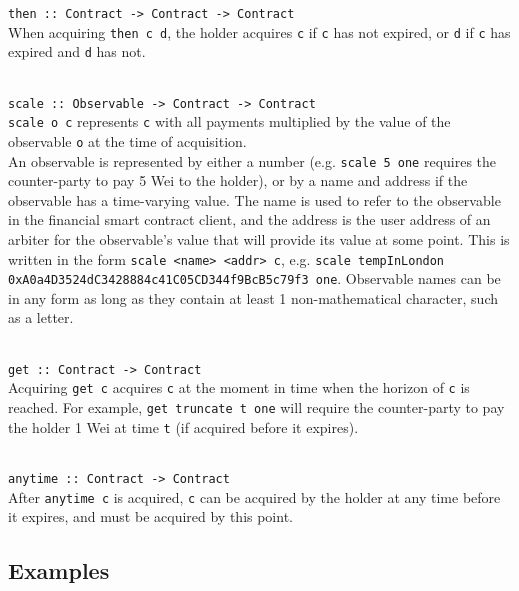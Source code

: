 \documentclass{article}
\begin{document}
\parbox{\textwidth}{
\texttt{then :: Contract -> Contract -> Contract} \\

When acquiring \texttt{then c d}, the holder acquires \texttt{c} if \texttt{c} has not expired, or \texttt{d} if \texttt{c} has expired and \texttt{d} has not. \\ \\
}

\parbox{\textwidth}{
\texttt{scale :: Observable -> Contract -> Contract} \\

\texttt{scale o c} represents \texttt{c} with all payments multiplied by the value of the observable \texttt{o} at the time of acquisition. \\

An observable is represented by either a number (e.g. \texttt{scale 5 one} requires the counter-party to pay 5 Wei to the holder), or by a name and address if the observable has a time-varying value. The name is used to refer to the observable in the financial smart contract client, and the address is the user address of an arbiter for the observable's value that will provide its value at some point. This is written in the form \texttt{scale <name> <addr> c}, e.g. \texttt{scale tempInLondon 0xA0a4D3524dC3428884c41C05CD344f9BcB5c79f3 one}. Observable names can be in any form as long as they contain at least 1 non-mathematical character, such as a letter. \\ \\
}

\parbox{\textwidth}{
\texttt{get :: Contract -> Contract} \\

Acquiring \texttt{get c} acquires \texttt{c} at the moment in time when the horizon of \texttt{c} is reached. For example, \texttt{get truncate t one} will require the counter-party to pay the holder 1 Wei at time \texttt{t} (if acquired before it expires). \\ \\
}

\parbox{\textwidth}{
\texttt{anytime :: Contract -> Contract} \\

After \texttt{anytime c} is acquired, \texttt{c} can be acquired by the holder at any time before it expires, and must be acquired by this point. \\
}


\subsection{Examples}
\end{document}
